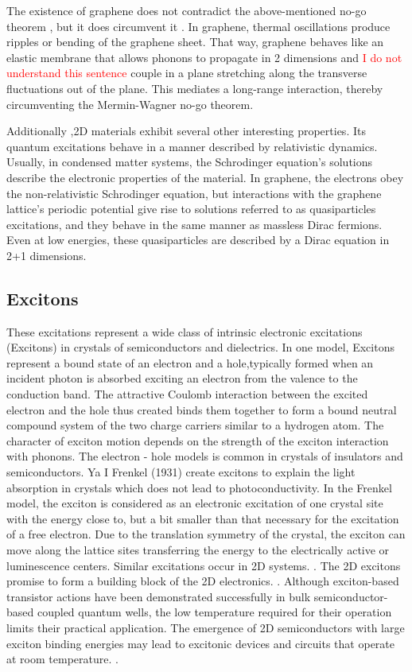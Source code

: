 The existence of graphene does not contradict the above-mentioned no-go theorem \cite{Mermin2}, but it does circumvent it \cite{GrapheneRiples}. In graphene, thermal oscillations produce ripples or bending of the graphene sheet. That way, graphene behaves like an elastic membrane that allows phonons to propagate in 2 dimensions and \textcolor{red}{I do not understand this sentence} couple in a plane stretching along the transverse fluctuations out of the plane. This mediates a long-range interaction, thereby circumventing the Mermin-Wagner no-go theorem. 

Additionally \cite{Graphene0},2D materials exhibit several other interesting properties. Its quantum excitations behave in a manner described by relativistic dynamics. Usually, in condensed matter systems, the Schrodinger equation's solutions describe the electronic properties of the material. In graphene, the electrons obey the non-relativistic Schrodinger equation, but interactions with the graphene lattice's periodic potential give rise to solutions referred to as quasiparticles excitations, and they behave in the same manner as massless Dirac fermions. Even at low energies, these quasiparticles are described by a Dirac equation in 2+1 dimensions. 

\subsection{Excitons}
These excitations represent a wide class of intrinsic electronic excitations (Excitons) \cite{Excitons1, Excitons2} in crystals of semiconductors and dielectrics. In one model, Excitons represent a bound state of an electron and a hole,typically formed when an incident photon is absorbed exciting an electron from the valence to the conduction band. The attractive Coulomb interaction between the excited electron and the hole thus created binds them together to form a bound neutral compound system of the two charge carriers similar to a hydrogen atom. 
The character of exciton motion depends on the strength of the exciton interaction with phonons. The electron - hole models is common in crystals of insulators and semiconductors.
Ya I Frenkel (1931) create excitons to explain the light absorption in crystals which does not lead to photoconductivity. In the Frenkel model, the exciton is considered as an electronic excitation of one crystal site with the energy close to, but a bit smaller than that necessary for the excitation of a free electron. Due to the translation symmetry of the crystal, the exciton can move along the lattice sites transferring the energy to the electrically active or luminescence centers.
Similar excitations occur in 2D systems. \cite{Excitons2D1,Excitons2D3}. The 2D excitons promise to form a building block of the 2D electronics. \cite{Excitons2D2}.  Although exciton-based transistor actions have been demonstrated successfully in bulk semiconductor-based coupled quantum wells, the low temperature required for their operation limits their practical application. The emergence of 2D semiconductors with large exciton binding energies may lead to excitonic devices and circuits that operate at room temperature. \cite{Excitons2D2}.

